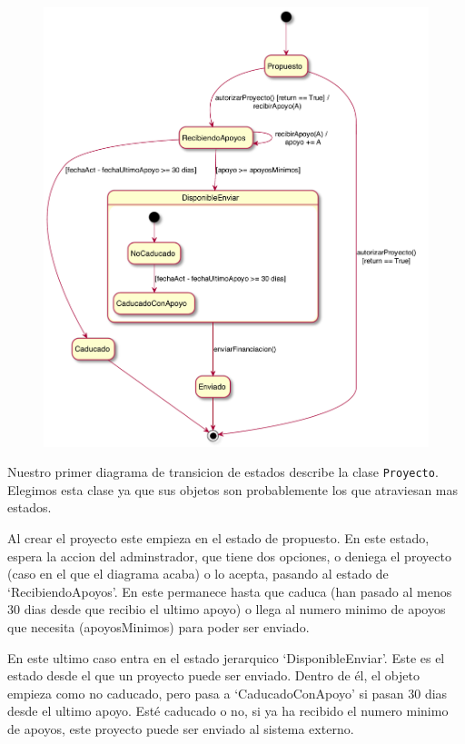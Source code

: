 \documentclass[12pt]{article}
\begin{document}
\begin{figure}[h!]
    \centering
    \includegraphics[scale=0.45]{Images/diagrama_estado_proyecto.pdf}
    \vspace{+10pt}
\end{figure}

Nuestro primer diagrama de transicion de estados describe la clase \texttt{Proyecto}. Elegimos esta clase ya que sus objetos son probablemente los que atraviesan mas estados.
\par
Al crear el proyecto este empieza en el estado de propuesto. En este estado, espera la accion del adminstrador, que tiene dos opciones, o deniega el proyecto (caso en el que el diagrama acaba) o lo acepta, pasando al estado de `RecibiendoApoyos'. En este permanece hasta que caduca (han pasado al menos 30 dias desde que recibio el ultimo apoyo) o llega al numero minimo de apoyos que necesita (apoyosMinimos) para poder ser enviado. 
\par 
En este ultimo caso entra en el estado jerarquico `DisponibleEnviar'. Este es el estado desde el que un proyecto puede ser enviado. Dentro de él, el objeto empieza como no caducado, pero pasa a `CaducadoConApoyo' si pasan 30 dias desde el ultimo apoyo. Esté caducado o no, si ya ha recibido el numero minimo de apoyos, este proyecto puede ser enviado al sistema externo.  
\end{document}
